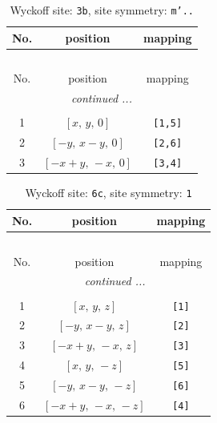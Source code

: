 \documentclass[fleqn,8pt]{jsarticle}
\begin{document}
\begin{longtable}{ccc}
\caption{Wyckoff site: {\tt 3b}, site symmetry: {\tt m'..}}
 \\
 \hline \hline
No. & position & mapping \\ \hline \endfirsthead

\multicolumn{2}{l}{\tablename\ \thetable{}} \\
 \hline \hline
No. & position & mapping \\ \hline \endhead

 \hline \hline
\multicolumn{2}{r}{\footnotesize\it continued ...} \\ \endfoot

 \hline \hline
\multicolumn{2}{r}{} \\ \endlastfoot

1 & $\left[ x,\, y,\, 0 \right]$ & {\tt [1,5]} \\ \hline
2 & $\left[ - y,\, x - y,\, 0 \right]$ & {\tt [2,6]} \\ \hline
3 & $\left[ - x + y,\, - x,\, 0 \right]$ & {\tt [3,4]} \\
\end{longtable}
\renewcommand{\arraystretch}{1.2}
\begin{longtable}{ccc}
\caption{Wyckoff site: {\tt 6c}, site symmetry: {\tt 1}}
 \\
 \hline \hline
No. & position & mapping \\ \hline \endfirsthead

\multicolumn{2}{l}{\tablename\ \thetable{}} \\
 \hline \hline
No. & position & mapping \\ \hline \endhead

 \hline \hline
\multicolumn{2}{r}{\footnotesize\it continued ...} \\ \endfoot

 \hline \hline
\multicolumn{2}{r}{} \\ \endlastfoot

1 & $\left[ x,\, y,\, z \right]$ & {\tt [1]} \\ \hline
2 & $\left[ - y,\, x - y,\, z \right]$ & {\tt [2]} \\ \hline
3 & $\left[ - x + y,\, - x,\, z \right]$ & {\tt [3]} \\ \hline
4 & $\left[ x,\, y,\, - z \right]$ & {\tt [5]} \\ \hline
5 & $\left[ - y,\, x - y,\, - z \right]$ & {\tt [6]} \\ \hline
6 & $\left[ - x + y,\, - x,\, - z \right]$ & {\tt [4]} \\
\end{longtable}
\end{document}
